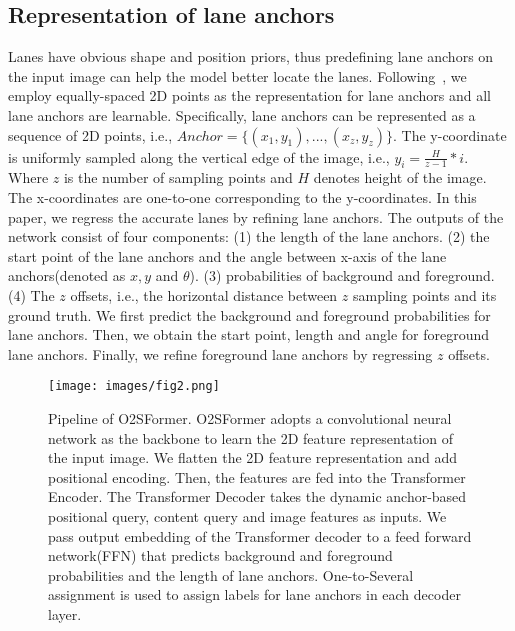 \documentclass{bmvc2k}
\begin{document}
\subsection{Representation of lane anchors}
\label{sec:rep}
Lanes have obvious shape and position priors, thus predefining lane anchors on the input 
image can help the model better locate the lanes. Following~\cite{zheng2022clrnet}, we employ equally-spaced 
2D points as the representation for lane anchors and all lane anchors are learnable. 
Specifically, lane anchors can be represented as a sequence of 2D points, i.e., $ Anchor=\{(x_{1},y_{1}),...,(x_{z},y_{z})\} $.
The y-coordinate is uniformly sampled along the vertical edge of the image, i.e.,
$y_{i}=\frac{H}{z-1}*i $. Where $z$ is the number of sampling points and $H$ denotes height of the image.
The x-coordinates are one-to-one corresponding to the y-coordinates. In this paper, 
we regress the accurate lanes by refining lane anchors. The outputs of the network 
consist of four components: (1) the length of the lane anchors. (2) the start point of 
the lane anchors and the angle between x-axis of the lane anchors(denoted as $x,y$ and $\theta$). 
(3) probabilities of background and foreground. (4) The $z$ offsets, i.e., the horizontal distance 
between $z$ sampling points and its ground truth. We first predict the background and foreground 
probabilities for lane anchors. Then, we obtain the start point, length and angle 
for foreground lane anchors. Finally, we refine foreground lane anchors by regressing $z$ offsets.

\begin{figure*}[!h]
   \begin{center}
   \texttt{[image: images/fig2.png]}
   \vspace{-0.5cm} 
   \end{center}
      \caption{Pipeline of O2SFormer. O2SFormer adopts a convolutional neural network as the backbone 
               to learn the 2D feature representation of the input image. We flatten the 2D feature 
               representation and add positional encoding. Then, the features are fed into the Transformer 
               Encoder. The Transformer Decoder takes the dynamic anchor-based positional query, content query 
               and image features as inputs. We pass output embedding of the Transformer decoder to a feed forward network(FFN) 
               that predicts background and foreground probabilities and the length of lane anchors. One-to-Several assignment is used to assign labels for lane anchors in each decoder layer.}
   \vspace{0.2cm}
   \label{fig:short2}
   \end{figure*}
\end{document}
